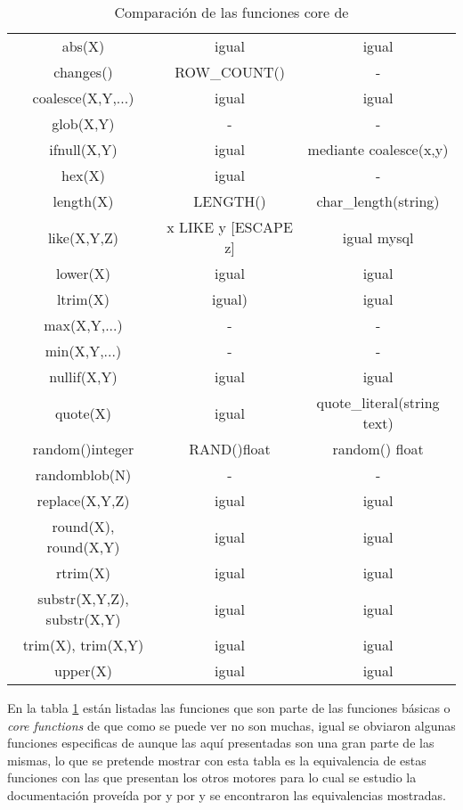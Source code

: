 \begin{table}[h]
\begin{center}
{
\selectfont
\begin{tabular}{|c|c|c|}
\hline 
\s & \m & \p \\  
\hline 
abs(X) & igual & igual \\ 
\hline 
changes() & ROW\_COUNT() & - \\ 
\hline 
coalesce(X,Y,...) & igual & igual \\ 
\hline 
glob(X,Y) & - & - \\ 
\hline 
ifnull(X,Y) & igual & mediante coalesce(x,y) \\ 
\hline 
hex(X) & igual & - \\ 
\hline 
length(X) & LENGTH() & char\_length(string) \\ 
\hline 
like(X,Y,Z) & x LIKE y [ESCAPE z] & igual mysql \\ 
\hline 
lower(X) & igual & igual \\ 
\hline 
ltrim(X) & igual) & igual \\ 
\hline 
max(X,Y,...) & - & - \\ 
\hline 
min(X,Y,...) & - & - \\ 
\hline 
nullif(X,Y) & igual & igual \\ 
\hline 
quote(X) & igual & quote\_literal(string text) \\ 
\hline 
random()integer & RAND()float & random() float \\ 
\hline 
randomblob(N) & - & - \\ 
\hline 
replace(X,Y,Z) & igual & igual \\ 
\hline 
round(X), round(X,Y) & igual & igual \\ 
\hline 
rtrim(X) & igual & igual \\ 
\hline 
substr(X,Y,Z), substr(X,Y) & igual & igual \\ 
\hline
trim(X), trim(X,Y) & igual & igual \\ 
\hline
upper(X) & igual & igual \\ 
\hline
\end{tabular}
}
\end{center}
\caption{Comparación de las funciones core de \s}
\label{tabla:core_functions}
\end{table}  
%
En la tabla \ref{tabla:core_functions} están listadas las funciones que son parte de las funciones básicas\citep{sqlite:functions} o \textit{core functions} de \s que como se puede ver no son muchas, igual se obviaron algunas funciones especificas de \s aunque las aquí presentadas son una gran parte de las mismas, lo que se pretende mostrar con esta tabla es la equivalencia de estas funciones con las que presentan los otros motores para lo cual se estudio la documentación proveída por \p\cite{postgre:functions} y por \m\citep{mysql:functions} y se encontraron las equivalencias mostradas.

